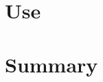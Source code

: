 \documentclass[xcolor=x11names,compress]{beamer}
\begin{document}
\section{Use}

\section{Summary}



\end{document}
